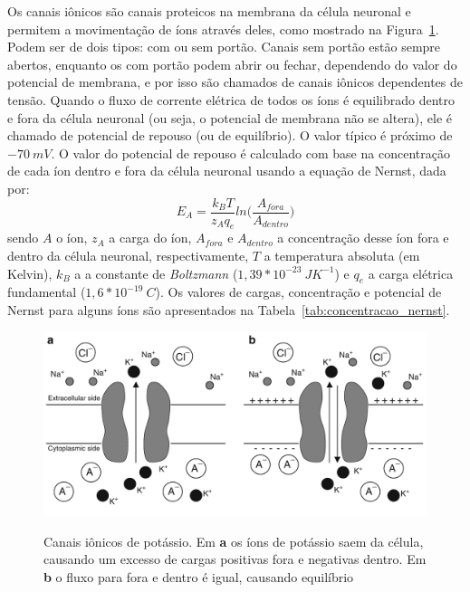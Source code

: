 Os canais iônicos são canais proteicos na membrana da célula neuronal e permitem a movimentação de íons através deles, como mostrado na Figura~\ref{fig:canaisions}. Podem ser de dois tipos: com ou sem portão. Canais sem portão estão sempre abertos, enquanto os com portão podem abrir ou fechar, dependendo do valor do potencial de membrana, e por isso são chamados de canais iônicos dependentes de tensão. Quando o fluxo de corrente elétrica de todos os íons é equilibrado dentro e fora da célula neuronal (ou seja, o potencial de membrana não se altera), ele é chamado de potencial de repouso (ou de equilíbrio). O valor típico é próximo de $-70\ mV$. O valor do potencial de repouso é calculado com base na concentração de cada íon dentro e fora da célula neuronal usando a equação de Nernst, dada por:
\begin{equation}\label{eq:nernst}
E_A=\frac{k_BT}{z_Aq_e}ln\Big(\frac{A_{fora}}{A_{dentro}}\Big)
\end{equation}
sendo $A$ o íon, $z_A$ a carga do íon, $A_{fora}$ e $A_{dentro}$ a concentração desse íon fora e dentro da célula neuronal, respectivamente, $T$ a temperatura absoluta (em Kelvin), $k_B$ a a constante de \textit{Boltzmann} ($1,39*10^{-23}\ JK^{-1}$) e $q_e$ a carga elétrica fundamental ($1,6*10^{-19}\ C$). Os valores de cargas, concentração e potencial de Nernst para alguns íons são apresentados na Tabela~\ref{tab:concentracao_nernst}.

\begin{figure}[tb!]
	\centering
	\caption[Canais iônicos de potássio]{Canais iônicos de potássio. Em \textbf{a} os íons de potássio saem da célula, causando um excesso de cargas positivas fora e negativas dentro. Em \textbf{b} o fluxo para fora e dentro é igual, causando equilíbrio}
	\label{fig:canaisions}
	\includegraphics[width=0.7\linewidth]{figs/canais_ions}
	\\
	\cite{ermentrout_mathematical_2010}
\end{figure}

